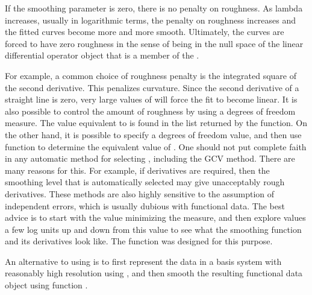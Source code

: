 \documentclass{article}
\begin{document}
\begin{Details}\relax
If the smoothing parameter  is zero, there is no penalty
on roughness.  As lambda increases, usually in logarithmic terms, the
penalty on roughness increases and the fitted curves become more and
more smooth.  Ultimately, the curves are forced to have zero roughness
in the sense of being in the null space of the linear differential
operator object that is a member of the .

For example, a common choice of roughness penalty is the integrated
square of the second derivative.  This penalizes curvature.  Since the
second derivative of a straight line is zero, very large values of
 will force the fit to become linear.  It is also
possible to control the amount of roughness by using a degrees of
freedom measure.  The value equivalent to  is found in
the list returned by the function.  On the other hand, it is possible
to specify a degrees of freedom value, and then use function
 to determine the equivalent value of .
One should not put complete faith in any automatic method for
selecting , including the GCV method. There are many
reasons for this.  For example, if derivatives are required, then the
smoothing level that is automatically selected may give unacceptably
rough derivatives.  These methods are also highly sensitive to the
assumption of independent errors, which is usually dubious with
functional data.  The best advice is to start with the value
minimizing the  measure, and then explore 
values a few log units up and down from this value to see what the
smoothing function and its derivatives look like.  The function
 was designed for this purpose.

An alternative to using  is to first represent
the data in a basis system with reasonably high resolution using
, and then smooth the resulting functional data object
using function .
\end{Details}
\end{document}

